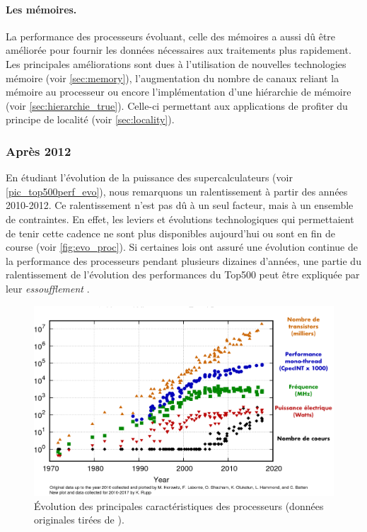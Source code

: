             \paragraph{Les mémoires.} La performance des processeurs évoluant, celle des mémoires a aussi dû être améliorée pour fournir les données nécessaires aux traitements plus rapidement. Les principales améliorations sont dues à l'utilisation de nouvelles technologies mémoire (voir \autoref{sec:memory}), l'augmentation du nombre de canaux reliant la mémoire au processeur ou encore l'implémentation d'une hiérarchie de mémoire (voir \autoref{sec:hierarchie_true}). Celle-ci permettant aux applications de profiter du principe de localité (voir \autoref{sec:locality}).
            
        
    \subsubsection{Après 2012}
    
        En étudiant l'évolution de la puissance des supercalculateurs (voir \autoref{pic_top500perf_evo}), nous remarquons un ralentissement à partir des années 2010-2012. Ce ralentissement n'est pas dû à un seul facteur, mais à un ensemble de contraintes. En effet, les leviers et évolutions technologiques qui permettaient de tenir cette cadence ne sont plus disponibles aujourd'hui ou sont en fin de course (voir \autoref{fig:evo_proc}). Si certaines lois ont assuré une évolution continue de la performance des processeurs pendant plusieurs dizaines d'années, une partie du ralentissement de l'évolution des performances du Top500 peut être expliquée par leur \textit{essoufflement} \cite{FrancoisBodin2015}.

       
        \begin{figure}
            \center
            \includegraphics[width=12cm]{images/evo_proc.png}
            \caption{\label{fig:evo_cpu} Évolution des principales caractéristiques des processeurs (données originales tirées de \cite{rupp40years}\protect\footnotemark).}
        \end{figure}
        
